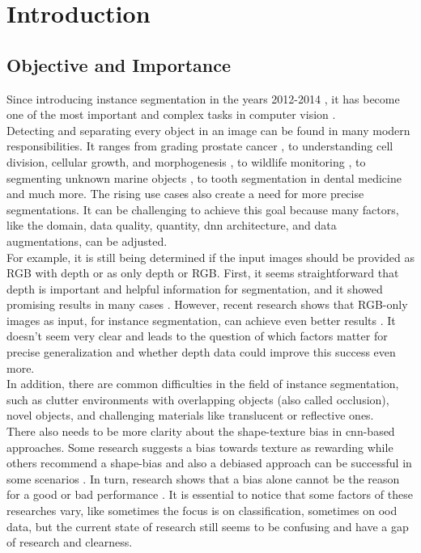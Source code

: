 
\chapter{Introduction}
\label{chap:kapitel1}



	\section{Objective and Importance}
	\label{sec:objective-and-importance}
		Since introducing instance segmentation in the years 2012-2014 \cite{Yang2012}\cite{Silbermann2012}\cite{Hariharan2014}, it has become one of the most important and complex tasks in computer vision \cite{Sharma2022}. \\
		Detecting and separating every object in an image can be found in many modern responsibilities. It ranges from grading prostate cancer \cite{Hassan2022}, to understanding cell division, cellular growth, and morphogenesis \cite{Kar2022}, to wildlife monitoring \cite{Haucke2021}, to segmenting unknown marine objects \cite{Hu2024}, to tooth segmentation in dental medicine \cite{Brahmi2023} and much more. The rising use cases also create a need for more precise segmentations. It can be challenging to achieve this goal because many factors, like the domain, data quality, quantity, \ac{dnn} architecture, and data augmentations, can be adjusted.\\
		For example, it is still being determined if the input images should be provided as RGB with depth or as only depth or RGB. First, it seems straightforward that depth is important and helpful information for segmentation, and it showed promising results in many cases \cite{Danielczuk2019}\cite{Xie2021}. However, recent research shows that RGB-only images as input, for instance segmentation, can achieve even better results \cite{Raj2023}. It doesn't seem very clear and leads to the question of which factors matter for precise generalization and whether depth data could improve this success even more.\\
		In addition, there are common difficulties in the field of instance segmentation, such as clutter environments with overlapping objects (also called occlusion), novel objects, and challenging materials like translucent or reflective ones.\\
		There also needs to be more clarity about the shape-texture bias in \ac{cnn}-based approaches. Some research suggests a bias towards texture as rewarding \cite{Qiu2024} while others recommend a shape-bias \cite{Geihors2019} and also a debiased approach can be successful in some scenarios \cite{Li2021}\cite{Co2021}\cite{Chung2023}. In turn, research shows that a bias alone cannot be the reason for a good or bad performance \cite{Gavrikov2024}. It is essential to notice that some factors of these researches vary, like sometimes the focus is on classification, sometimes on \ac{ood} data, but the current state of research still seems to be confusing and have a gap of research and clearness.\\
